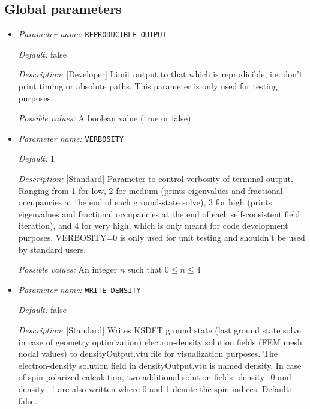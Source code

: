 \subsection{Global parameters}
\label{parameters:global}


\begin{itemize}
\item {\it Parameter name:} {\tt REPRODUCIBLE OUTPUT}
\label{parameters:REPRODUCIBLE OUTPUT}
\label{parameters:REPRODUCIBLE_20OUTPUT}




{\it Default:} false


{\it Description:} [Developer] Limit output to that which is reprodicible, i.e. don't print timing or absolute paths. This parameter is only used for testing purposes.


{\it Possible values:} A boolean value (true or false)
\item {\it Parameter name:} {\tt VERBOSITY}
\label{parameters:VERBOSITY}




{\it Default:} 1


{\it Description:} [Standard] Parameter to control verbosity of terminal output. Ranging from 1 for low, 2 for medium (prints eigenvalues and fractional occupancies at the end of each ground-state solve), 3 for high (prints eigenvalues and fractional occupancies at the end of each self-consistent field iteration), and 4 for very high, which is only meant for code development purposes. VERBOSITY=0 is only used for unit testing and shouldn't be used by standard users.


{\it Possible values:} An integer $n$ such that $0\leq n \leq 4$
\item {\it Parameter name:} {\tt WRITE DENSITY}
\label{parameters:WRITE DENSITY}
\label{parameters:WRITE_20DENSITY}




{\it Default:} false


{\it Description:} [Standard] Writes KSDFT ground state (last ground state solve in case of geometry optimization) electron-density solution fields (FEM mesh nodal values) to densityOutput.vtu file for visualization purposes. The electron-density solution field in densityOutput.vtu is named density. In case of spin-polarized calculation, two additional solution fields- density\_0 and density\_1 are also written where 0 and 1 denote the spin indices. Default: false.



\end{itemize}
